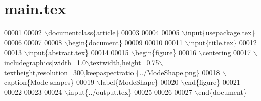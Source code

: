 \hypertarget{main_8tex_source}{}\section{main.\+tex}
\label{main_8tex_source}

\begin{DoxyCode}
00001 %
00002 \(\backslash\)documentclass\{article\}
00003 
00004 %
00005    \(\backslash\)input\{usepackage.tex\}
00006 
00007 %
00008 \(\backslash\)begin\{document\}
00009        
00010 %
00011    \(\backslash\)input\{title.tex\}
00012 
00013    \(\backslash\)input\{abstract.tex\}
00014 
00015 \(\backslash\)begin\{figure\}
00016 \(\backslash\)centering
00017 
      \(\backslash\)includegraphics[width=1.0\(\backslash\)textwidth,height=0.75\(\backslash\)textheight,resolution=300,keepaspectratio]\{../ModeShape.png\}
00018 \(\backslash\)caption\{Mode shapes\}
00019 \(\backslash\)label\{ModeShape\}
00020 \(\backslash\)end\{figure\}
00021 
00022 
00023 %
00024    \(\backslash\)input\{../output.tex\}
00025 
00026 %
00027 \(\backslash\)end\{document\}
\end{DoxyCode}
